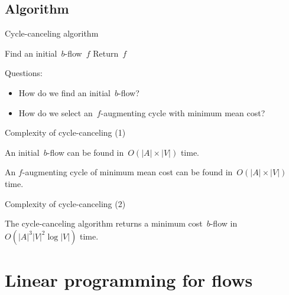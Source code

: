 \documentclass{beamer}
\begin{document}
\subsection{Algorithm}

\begin{frame}[t]{Cycle-canceling algorithm \citep{goldbergFindingMinimumcostCirculations1989}} \pause
  \setcounter{algocf}{4}
  \begin{algorithm}[H]
        \caption{Cycle-canceling algorithm}
   \SetAlgoLined \pause
     \pause
   Find an initial~$b$-flow~$f$\; \pause
    \pause
   Return~$f$
  \end{algorithm}
  \vfill \pause
  Questions: \pause
  \begin{itemize}
    \item How do we find an initial~$b$-flow? \pause
    \item How do we select an~$f$-augmenting cycle with minimum mean cost?
  \end{itemize}
\end{frame}

\begin{frame}[t]{Complexity of cycle-canceling (1)} \pause
  \begin{proposition}[ex 6.4]
    An initial~$b$-flow can be found in~$O(|A| \times |V|)$ time.
  \end{proposition}
  \vfill \pause
  \begin{proposition}[ex 6.3]
    An $f$-augmenting cycle of minimum mean cost can be found in~$O(|A| \times |V|)$ time.
  \end{proposition}
  \vfill
\end{frame}

\begin{frame}{Complexity of cycle-canceling (2)} \pause
  \begin{theorem}[6.10]
    The cycle-canceling algorithm returns a minimum cost~$b$-flow in~$O(|A|^3 |V|^2 \log|V|)$ time.
  \end{theorem}
\end{frame}

\section{Linear programming for flows}
\end{document}
